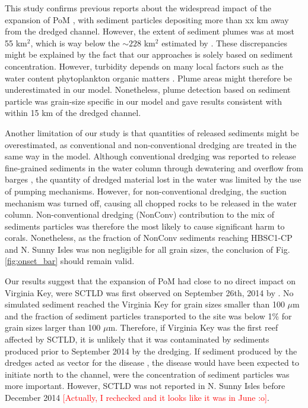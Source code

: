 \documentclass[preprint,12pt,authoryear]{elsarticle}
\begin{document}
This study confirms previous reports about the widespread impact of the expansion of PoM \citep{barnes2015sediment,miller2016detecting,cunning2019extensive}, with sediment particles depositing more than xx km away from the dredged channel. However, the extent of sediment plumes was at most 55 km$^2$, which is way below the $\sim228$ km$^2$ estimated by \cite{barnes2015sediment}. These discrepancies might be explained by the fact that our approaches is solely based on sediment concentration. However, turbidity depends on many local factors such as the water content phytoplankton organic matters \citep{gray2000comparability,thackston2000improved}. Plume areas might therefore be underestimated in our model. Nonetheless, plume detection based on sediment particle was grain-size specific in our model and gave results consistent with \cite{cunning2019extensive} within 15 km of the dredged channel.

Another limitation of our study is that quantities of released sediments might be overestimated, as conventional and non-conventional dredging are treated in the same way in the model. Although conventional dredging was reported to release fine-grained sediments in the water column through dewatering and overflow from barges \citep{jones2016assessing}, the quantity of dredged material lost in the water was limited by the use of pumping mechanisms. However, for non-conventional dredging, the suction mechanism was turned off, causing all chopped rocks to be released in the water column. Non-conventional dredging (NonConv) contribution to the mix of sediments particles was therefore the most likely to cause significant harm to corals. Nonetheless, as the fraction of NonConv sediments reaching HBSC1-CP and N. Sunny Isles was non negligible for all grain sizes, the conclusion of Fig. \ref{fig:onset_bar} should remain valid. 

Our results suggest that the expansion of PoM had close to no direct impact on Virginia Key, were SCTLD was first observed on September 26th, 2014 by \cite{precht2016unprecedented}. No simulated sediment reached the Virginia Key for grain sizes smaller than 100 $\mu$m and the fraction of sediment particles transported to the site was below 1\% for grain sizes larger than 100 $\mu$m. Therefore, if Virginia Key was the first reef affected by SCTLD, it is unlikely that it was contaminated by sediments produced prior to September 2014 by the dredging. If sediment produced by the dredges acted as vector for the disease \citep{rosales2020rhodobacterales, studivan2022reef}, the disease would have been expected to initiate north to the channel, were the concentration of sediment particles was more important. However, SCTLD was not reported in N. Sunny Isles before December 2014 \citep{precht2016unprecedented} \textcolor{red}{[Actually, I rechecked and it looks like it was in June :o]}.
\end{document}
